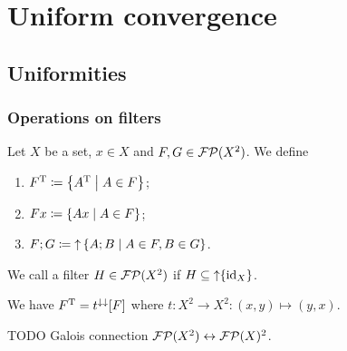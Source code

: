 \chapter{Uniform convergence}
\section{Uniformities}
\subsection{Operations on filters}
\begin{definition}
Let $X$ be a set, $x\in X$ and $F,G\in\operatorname{\mathcal{FP}}(X^2)$. We define
\begin{enumerate}
\item $F^{\mathrm{T}} \coloneqq \left\{ A^{\mathrm{T}} \;\middle|\; A\in F \right\}$;
\item $Fx \coloneqq \left\{ Ax \;\middle|\; A\in F \right\}$;
\item $F;G \coloneqq \operatorname{\uparrow} \left\{ A;B \;\middle|\; A\in F, B\in G \right\}$.
\end{enumerate}
We call a filter $H\in\operatorname{\mathcal{FP}}(X^2)$  if $H\subseteq \operatorname{\uparrow} \{\operatorname{id}_X\}$.
\end{definition}

We have $F^{\mathrm{T}} = t^{\downarrow\downarrow}[F]$ where $t: X^2 \to X^2: (x,y)\mapsto (y,x)$.

TODO Galois connection $\operatorname{\mathcal{FP}}(X^2) \leftrightarrow \operatorname{\mathcal{FP}}(X)^2$.


